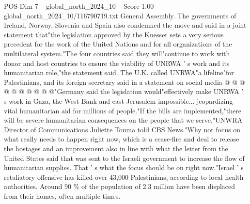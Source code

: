 \begin{textsample}{POS Dim 7 – global\_north\_2024\_10 – Score 1.00 – global\_north\_2024\_10/116790719.txt}
General Assembly.
The governments of Ireland, Norway, Slovenia and Spain also condemned the move and said in a joint statement that"the legislation approved by the Knesset sets a very serious precedent for the work of the United Nations and for all organizations of the multilateral system."The four countries said they will"continue to work with donor and host countries to ensure the viability of UNRWA ' s work and its humanitarian role,"the statement said.
The U.K. called UNRWA"a lifeline"for Palestinians, and its foreign secretary said in a statement on social media @ @ @ @ @ @ @ @ @ @"Germany said the legislation would"effectively make UNRWA ' s work in Gaza, the West Bank and east Jerusalem impossible... jeopardizing vital humanitarian aid for millions of people."If the bills are implemented,"there will be severe humanitarian consequences on the people that we serve,"UNWRA Director of Communications Juliette Touma told CBS News."Why not focus on what really needs to happen right now, which is a cease-fire and deal to release the hostages and an improvement also in line with what the letter from the United States said that was sent to the Israeli government to increase the flow of humanitarian supplies.
That ' s what the focus should be on right now."Israel ' s retaliatory offensive has killed over 43,000 Palestinians, according to local health authorities.
Around 90 \% of the population of 2.3 million have been displaced from their homes, often multiple times.

\end{textsample}
